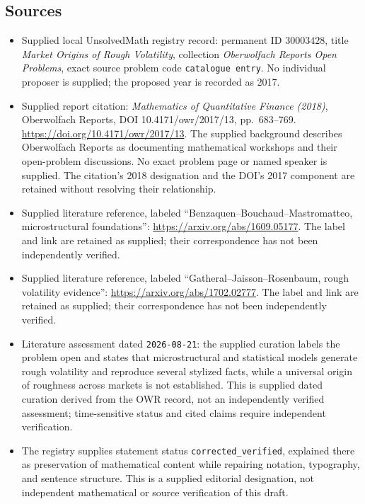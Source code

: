 \documentclass[11pt]{article}
\begin{document}
\subsection{Sources}
\begin{itemize}
\item Supplied local UnsolvedMath registry record: permanent ID \(30003428\), title \emph{Market Origins of Rough Volatility}, collection \emph{Oberwolfach Reports Open Problems}, exact source problem code \texttt{catalogue entry}. No individual proposer is supplied; the proposed year is recorded as 2017.
\item Supplied report citation: \emph{Mathematics of Quantitative Finance (2018)}, Oberwolfach Reports, DOI 10.4171/owr/2017/13, pp.~683--769. \url{https://doi.org/10.4171/owr/2017/13}. The supplied background describes Oberwolfach Reports as documenting mathematical workshops and their open-problem discussions. No exact problem page or named speaker is supplied. The citation's 2018 designation and the DOI's 2017 component are retained without resolving their relationship.
\item Supplied literature reference, labeled ``Benzaquen--Bouchaud--Mastromatteo, microstructural foundations'': \url{https://arxiv.org/abs/1609.05177}. The label and link are retained as supplied; their correspondence has not been independently verified.
\item Supplied literature reference, labeled ``Gatheral--Jaisson--Rosenbaum, rough volatility evidence'': \url{https://arxiv.org/abs/1702.02777}. The label and link are retained as supplied; their correspondence has not been independently verified.
\item Literature assessment dated \texttt{2026-08-21}: the supplied curation labels the problem open and states that microstructural and statistical models generate rough volatility and reproduce several stylized facts, while a universal origin of roughness across markets is not established. This is supplied dated curation derived from the OWR record, not an independently verified assessment; time-sensitive status and cited claims require independent verification.
\item The registry supplies statement status \texttt{corrected\_verified}, explained there as preservation of mathematical content while repairing notation, typography, and sentence structure. This is a supplied editorial designation, not independent mathematical or source verification of this draft.
\end{itemize}
\end{document}
